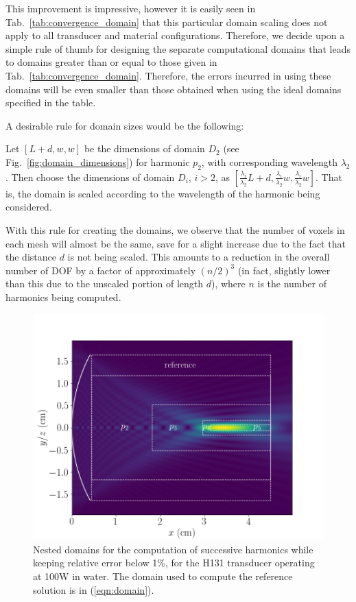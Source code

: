 \documentclass[11pt]{article}
\numberwithin{equation}{section}
\begin{document}
This improvement is impressive, however it is easily seen in Tab.~\ref{tab:convergence_domain}
that this particular domain scaling does not apply to all transducer and material
configurations. Therefore, we decide upon a simple rule of thumb for designing
the separate computational domains that leads to domains greater than or 
equal to those given in Tab.~\ref{tab:convergence_domain}. Therefore, the errors 
incurred in using these domains will be even smaller than those obtained when using
the ideal domains specified in the table.

A desirable rule for domain sizes would be the following:
\begin{quoting}
    Let $[L+d, w, w]$ be the dimensions of domain $D_2$ (see Fig.~\ref{fig:domain_dimensions})
    for harmonic $p_2$, with corresponding wavelength $\lambda_2$. Then 
    choose the dimensions of domain $D_{i}$, $i>2$, as 
    $[\frac{\lambda_i}{\lambda_2}L+d, \frac{\lambda_i}{\lambda_2}w, \frac{\lambda_i}{\lambda_2}w]$. That is,
    the domain is scaled according to the wavelength of the harmonic being considered.
\end{quoting}
With this rule for creating the domains, we observe that the number of voxels in 
each mesh will almost be the same, save for a slight increase due to the 
fact that the distance $d$ is not being scaled. This amounts to a reduction in 
the overall number of DOF by a factor of approximately $(n/2)^3$ (in fact, slightly
lower than this due to the unscaled portion of length $d$), where $n$ 
is the number of harmonics being computed.


\begin{figure}[h!]
    \centering
    \includegraphics[width=\linewidth]{Figure10}
    \caption{Nested domains for the computation of successive harmonics while
    keeping relative error below 1\%, for the H131 transducer operating at 100W 
    in water. The domain used to compute the reference 
    solution is in (\ref{eqn:domain}).}
    \label{fig:H131_water_subdomains}
\end{figure}  
\end{document}
